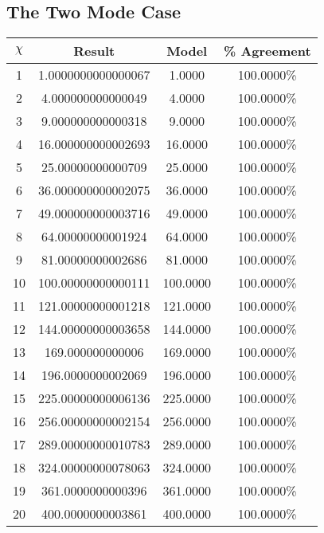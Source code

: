 \documentclass[11pt,a4paper]{article}
\numberwithin{equation}{section}
\begin{document}
\begin{appendices}
\subsection{The Two Mode Case}
\label{sec:twomodetablesimple}
\begin{center}
	\begin{tabular}{c|cc|c}
		$\chi$ & Result & Model & \% Agreement \\
		\hline
		1 & 1.0000000000000067 & 1.0000 & 100.0000\% \\
		2 & 4.000000000000049 & 4.0000 & 100.0000\% \\
		3 & 9.000000000000318 & 9.0000 & 100.0000\% \\
		4 & 16.000000000002693 & 16.0000 & 100.0000\% \\
		5 & 25.00000000000709 & 25.0000 & 100.0000\% \\
		6 & 36.000000000002075 & 36.0000 & 100.0000\% \\
		7 & 49.000000000003716 & 49.0000 & 100.0000\% \\
		8 & 64.00000000001924 & 64.0000 & 100.0000\% \\
		9 & 81.00000000002686 & 81.0000 & 100.0000\% \\
		10 & 100.00000000000111 & 100.0000 & 100.0000\% \\
		11 & 121.00000000001218 & 121.0000 & 100.0000\% \\
		12 & 144.00000000003658 & 144.0000 & 100.0000\% \\
		13 & 169.000000000006 & 169.0000 & 100.0000\% \\
		14 & 196.0000000002069 & 196.0000 & 100.0000\% \\
		15 & 225.00000000006136 & 225.0000 & 100.0000\% \\
		16 & 256.00000000002154 & 256.0000 & 100.0000\% \\
		17 & 289.00000000010783 & 289.0000 & 100.0000\% \\
		18 & 324.00000000078063 & 324.0000 & 100.0000\% \\
		19 & 361.0000000000396 & 361.0000 & 100.0000\% \\
		20 & 400.0000000003861 & 400.0000 & 100.0000\% \\
		\hline
	\end{tabular}
\end{center}


\end{appendices}
\end{document}
